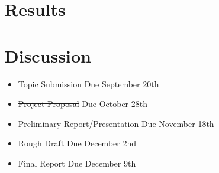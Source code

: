 \documentclass[letterpaper, 10pt, titlepage, twocolumn]{article}
\begin{document}
\section*{Results}


\section*{Discussion}
\begin{itemize}
  \item \normalsize \st{Topic Submission} \footnotesize Due September 20th
  \item \normalsize \st{Project Proposal} \footnotesize Due October 28th
  \item \normalsize Preliminary Report/Presentation \footnotesize Due November 18th
  \item \normalsize Rough Draft \footnotesize Due December 2nd
  \item \normalsize Final Report \footnotesize Due December 9th
\end{itemize}

\printbibliography

\end{document}
